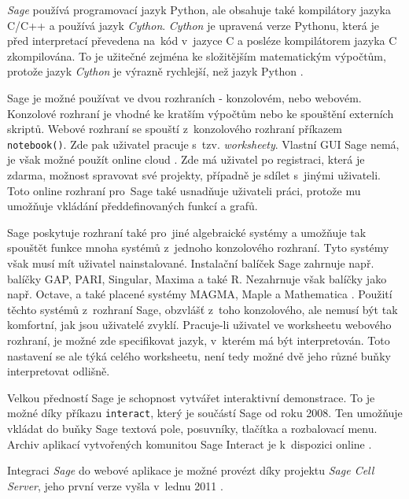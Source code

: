\documentclass[thesis=B,czech]{FITthesis}[2012/06/26]
\begin{document}
\textit{Sage} používá programovací jazyk Python, ale obsahuje také kompilátory jazyka C/C++ a používá jazyk \textit{Cython}. \textit{Cython} je upravená verze Pythonu, která je před interpretací převedena na~kód v~jazyce C a posléze kompilátorem jazyka C zkompilována. To je užitečné zejména ke složitějším matematickým výpočtům, protože jazyk \textit{Cython} je výrazně rychlejší, než jazyk Python \cite{Cython}.

Sage je možné používat ve dvou rozhraních - konzolovém, nebo webovém. Konzolové rozhraní je vhodné ke kratším výpočtům nebo ke spouštění externích skriptů. Webové rozhraní se spouští z~konzolového rozhraní příkazem \texttt{notebook()}. Zde pak uživatel pracuje s~tzv. \textit{worksheety}. Vlastní GUI Sage nemá, je však možné použít online cloud \cite{SageCloud}.  Zde má uživatel po registraci, která je zdarma, možnost spravovat své projekty, případně je sdílet s~jinými uživateli. Toto online rozhraní pro~Sage také usnadňuje uživateli práci, protože mu umožňuje vkládání předdefinovaných funkcí a grafů.

Sage poskytuje rozhraní také pro~jiné algebraické systémy a umožňuje tak spouštět funkce mnoha systémů z~jednoho konzolového rozhraní. Tyto systémy však musí mít uživatel nainstalované. Instalační balíček Sage zahrnuje např. balíčky GAP, PARI, Singular, Maxima a také R. Nezahrnuje však balíčky jako např. Octave, a také placené systémy MAGMA, Maple a Mathematica \cite{SageInterfaces}. Použití těchto systémů z~rozhraní Sage, obzvlášť z~toho konzolového, ale nemusí být tak komfortní, jak jsou uživatelé zvyklí. Pracuje-li uživatel ve worksheetu webového rozhraní, je možné zde specifikovat jazyk, v~kterém má být interpretován. Toto nastavení se ale týká celého worksheetu, není tedy možné dvě jeho různé buňky interpretovat odlišně. 

Velkou předností Sage je schopnost vytvářet interaktivní demonstrace. To je možné díky příkazu \texttt{interact}, který je součástí Sage od roku 2008. Ten umožňuje vkládat do buňky Sage textová pole, posuvníky, tlačítka a rozbalovací menu. Archiv aplikací vytvořených komunitou Sage Interact je k~dispozici online \cite{SageInteract}. 

Integraci \textit{Sage} do webové aplikace je možné provézt díky projektu \textit{Sage Cell Server}, jeho první verze vyšla v~lednu 2011 \cite{SageCellServer}. 
\end{document}
